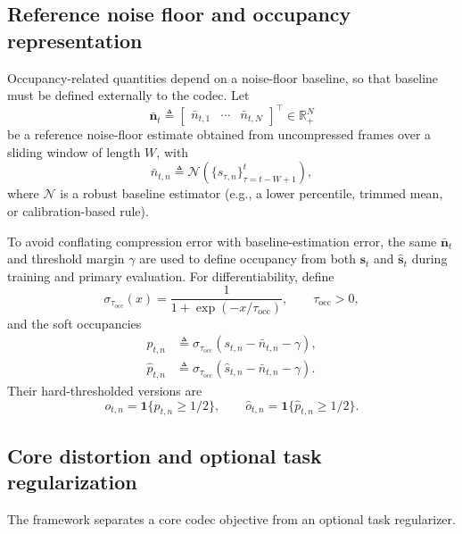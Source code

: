 \documentclass[11pt]{article}
\begin{document}
\subsection{Reference noise floor and occupancy representation}
Occupancy-related quantities depend on a noise-floor baseline, so that baseline must be defined
externally to the codec. Let
\begin{equation}
\bar{\mathbf{n}}_t
\triangleq
\begin{bmatrix}
\bar{n}_{t,1} & \cdots & \bar{n}_{t,N}
\end{bmatrix}^{\top}
\in \mathbb{R}_{+}^{N}
\end{equation}
be a reference noise-floor estimate obtained from uncompressed frames over a sliding window of
length $W$, with
\begin{equation}
\bar{n}_{t,n}
\triangleq
\mathcal{N}\!\left(
\{s_{\tau,n}\}_{\tau=t-W+1}^{t}
\right),
\end{equation}
where $\mathcal{N}$ is a robust baseline estimator (e.g., a lower percentile, trimmed mean, or
calibration-based rule).

To avoid conflating compression error with baseline-estimation error, the same
$\bar{\mathbf{n}}_t$ and threshold margin $\gamma$ are used to define occupancy from both
$\mathbf{s}_t$ and $\hat{\mathbf{s}}_t$ during training and primary evaluation.
For differentiability, define
\begin{equation}
\sigma_{\tau_{\mathrm{occ}}}(x)
=
\frac{1}{1+\exp(-x/\tau_{\mathrm{occ}})},
\qquad
\tau_{\mathrm{occ}} > 0,
\end{equation}
and the soft occupancies
\begin{align}
p_{t,n}
&\triangleq
\sigma_{\tau_{\mathrm{occ}}}(s_{t,n}-\bar{n}_{t,n}-\gamma), \\
\hat{p}_{t,n}
&\triangleq
\sigma_{\tau_{\mathrm{occ}}}(\hat{s}_{t,n}-\bar{n}_{t,n}-\gamma).
\end{align}
Their hard-thresholded versions are
\begin{equation}
o_{t,n} = \mathbf{1}\{p_{t,n} \ge 1/2\},
\qquad
\hat{o}_{t,n} = \mathbf{1}\{\hat{p}_{t,n} \ge 1/2\}.
\end{equation}

\subsection{Core distortion and optional task regularization}
The framework separates a core codec objective from an optional task regularizer.
\end{document}
